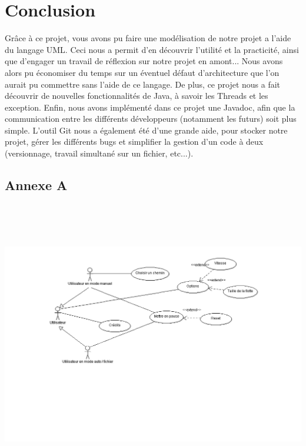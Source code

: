 \documentclass[a4paper, titlepage]{report}
\begin{document}
\chapter*{Conclusion}
\vspace{7cm}
Grâce à ce projet, vous avons pu faire une modélisation de notre projet a l'aide du langage UML. Ceci nous a permit d'en découvrir l'utilité et la practicité, ainsi que d'engager un travail de réflexion sur notre projet en amont... Nous avons alors pu économiser du temps sur un éventuel défaut d'architecture que l'on aurait pu commettre sans l'aide de ce langage. De plus, ce projet nous a fait découvrir de nouvelles fonctionnalités de Java, à savoir les Threads et les exception. Enfin, nous avons implémenté dans ce projet une Javadoc, afin que la communication entre les différents développeurs (notamment les futurs) soit plus simple. L'outil Git nous a également été d'une grande aide, pour stocker notre projet, gérer les différents bugs et simplifier la gestion d'un code à deux (versionnage, travail simultané sur un fichier, etc...).
\appendix
\begin{landscape}
\setcounter{page}{19}
\chapter*{Annexe A}
\includegraphics[width=723px, height=475px]{Images/CasUtilisation.PNG}
\end{landscape}
\end{document}
